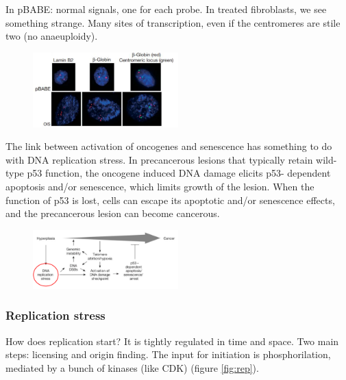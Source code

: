 In pBABE: normal signals, one for each probe. In treated fibroblasts, we
see something strange. Many sites of transcription, even if the
centromeres are stile two (no anaeuploidy).

\begin{figure}[h!]
\centering
\includegraphics[width=0.5\textwidth]{../_resources/b399b9d2beb17cee2a4d602739e97b08.png} 
\label{fig:senescence}
\end{figure}

The link between activation of oncogenes and senescence has something to
do with DNA replication stress. In precancerous lesions that typically
retain wild-type p53 function, the oncogene induced DNA damage elicits
p53- dependent apoptosis and/or senescence, which limits growth of the
lesion. When the function of p53 is lost, cells can escape its apoptotic
and/or senescence effects, and the precancerous lesion can become
cancerous.

\begin{figure}[h!]
\centering
\includegraphics[width=0.5\textwidth]{../_resources/504253851a3ef8203e6353a576814cc4.png} 
\label{fig:senescence}
\end{figure}

\hypertarget{replication-stress}{%
\subsubsection{Replication stress}\label{replication-stress}}

How does replication start? It is tightly regulated in time and space.
Two main steps: licensing and origin finding. The input for initiation
is phosphorilation, mediated by a bunch of kinases (like CDK) (figure \ref{fig:rep}).

